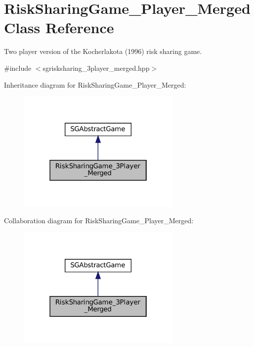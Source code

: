 \hypertarget{classRiskSharingGame__3Player__Merged}{}\section{Risk\+Sharing\+Game\+\_\+Player\+\_\+\+Merged Class Reference}
\label{classRiskSharingGame__3Player__Merged}


Two player version of the Kocherlakota (1996) risk sharing game.  




{\ttfamily \#include $<$sgrisksharing\+\_\+3player\+\_\+merged.\+hpp$>$}



Inheritance diagram for Risk\+Sharing\+Game\+\_\+Player\+\_\+\+Merged\+:
\nopagebreak
\begin{figure}[H]
\begin{center}
\leavevmode
\includegraphics[width=226pt]{classRiskSharingGame__3Player__Merged__inherit__graph}
\end{center}
\end{figure}


Collaboration diagram for Risk\+Sharing\+Game\+\_\+Player\+\_\+\+Merged\+:
\nopagebreak
\begin{figure}[H]
\begin{center}
\leavevmode
\includegraphics[width=226pt]{classRiskSharingGame__3Player__Merged__coll__graph}
\end{center}
\end{figure}
